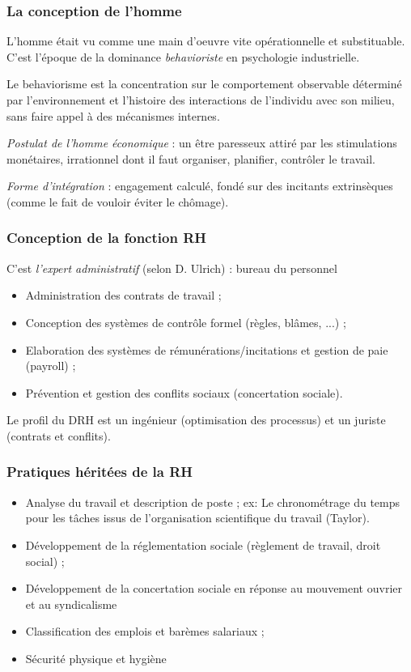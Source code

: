 \documentclass[12pt]{article}
\begin{document}
	  \subsubsection{La conception de l'homme}
	  
	  L'homme était vu comme une main d'oeuvre vite opérationnelle et substituable. C'est l'époque de la dominance \textit{behavioriste} en psychologie industrielle.
	  
	  Le behaviorisme est la concentration sur le comportement observable déterminé par l'environnement et l'histoire des interactions de l'individu avec son milieu, sans faire appel à des mécanismes internes.
	  
	  \emph{Postulat de l'homme économique} : un être paresseux attiré par les stimulations monétaires, irrationnel dont il faut organiser, planifier, contrôler le travail.
	  
	  \emph{Forme d'intégration} : engagement calculé, fondé sur des incitants extrinsèques (comme le fait de vouloir éviter le chômage).
	  
	  \subsubsection{Conception de la fonction RH}
	  
	  C'est \emph{l'expert administratif} (selon D. Ulrich) : \og{} bureau du personnel \fg{}
	  
	  \begin{itemize}
	   \item Administration des contrats de travail ;
	   \item Conception des systèmes de contrôle formel (règles, blâmes, ...) ;
	   \item Elaboration des systèmes de rémunérations/incitations et gestion de paie (payroll) ;
	   \item Prévention et gestion des conflits sociaux (concertation sociale). 
	  \end{itemize}
	  
	  Le profil du DRH est un ingénieur (optimisation des processus) et un juriste (contrats et conflits).
	  
	  \subsubsection{Pratiques héritées de la RH}
	  
	  \begin{itemize}
	   \item Analyse du travail et description de poste ; \newline
	   ex: Le chronométrage du temps pour les tâches issus de l'organisation scientifique du travail (Taylor).
	   \item Développement de la réglementation sociale (règlement de travail, droit social) ;
	   \item Développement de la concertation sociale en réponse au mouvement ouvrier et au syndicalisme
	   \item Classification des emplois et barèmes salariaux ;
	   \item Sécurité physique et hygiène
	  \end{itemize}
\end{document}
